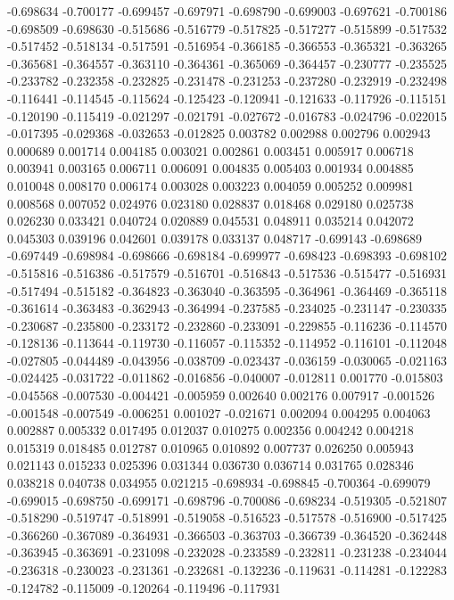 -0.698634
-0.700177
-0.699457
-0.697971
-0.698790
-0.699003
-0.697621
-0.700186
-0.698509
-0.698630
-0.515686
-0.516779
-0.517825
-0.517277
-0.515899
-0.517532
-0.517452
-0.518134
-0.517591
-0.516954
-0.366185
-0.366553
-0.365321
-0.363265
-0.365681
-0.364557
-0.363110
-0.364361
-0.365069
-0.364457
-0.230777
-0.235525
-0.233782
-0.232358
-0.232825
-0.231478
-0.231253
-0.237280
-0.232919
-0.232498
-0.116441
-0.114545
-0.115624
-0.125423
-0.120941
-0.121633
-0.117926
-0.115151
-0.120190
-0.115419
-0.021297
-0.021791
-0.027672
-0.016783
-0.024796
-0.022015
-0.017395
-0.029368
-0.032653
-0.012825
0.003782
0.002988
0.002796
0.002943
0.000689
0.001714
0.004185
0.003021
0.002861
0.003451
0.005917
0.006718
0.003941
0.003165
0.006711
0.006091
0.004835
0.005403
0.001934
0.004885
0.010048
0.008170
0.006174
0.003028
0.003223
0.004059
0.005252
0.009981
0.008568
0.007052
0.024976
0.023180
0.028837
0.018468
0.029180
0.025738
0.026230
0.033421
0.040724
0.020889
0.045531
0.048911
0.035214
0.042072
0.045303
0.039196
0.042601
0.039178
0.033137
0.048717
-0.699143
-0.698689
-0.697449
-0.698984
-0.698666
-0.698184
-0.699977
-0.698423
-0.698393
-0.698102
-0.515816
-0.516386
-0.517579
-0.516701
-0.516843
-0.517536
-0.515477
-0.516931
-0.517494
-0.515182
-0.364823
-0.363040
-0.363595
-0.364961
-0.364469
-0.365118
-0.361614
-0.363483
-0.362943
-0.364994
-0.237585
-0.234025
-0.231147
-0.230335
-0.230687
-0.235800
-0.233172
-0.232860
-0.233091
-0.229855
-0.116236
-0.114570
-0.128136
-0.113644
-0.119730
-0.116057
-0.115352
-0.114952
-0.116101
-0.112048
-0.027805
-0.044489
-0.043956
-0.038709
-0.023437
-0.036159
-0.030065
-0.021163
-0.024425
-0.031722
-0.011862
-0.016856
-0.040007
-0.012811
0.001770
-0.015803
-0.045568
-0.007530
-0.004421
-0.005959
0.002640
0.002176
0.007917
-0.001526
-0.001548
-0.007549
-0.006251
0.001027
-0.021671
0.002094
0.004295
0.004063
0.002887
0.005332
0.017495
0.012037
0.010275
0.002356
0.004242
0.004218
0.015319
0.018485
0.012787
0.010965
0.010892
0.007737
0.026250
0.005943
0.021143
0.015233
0.025396
0.031344
0.036730
0.036714
0.031765
0.028346
0.038218
0.040738
0.034955
0.021215
-0.698934
-0.698845
-0.700364
-0.699079
-0.699015
-0.698750
-0.699171
-0.698796
-0.700086
-0.698234
-0.519305
-0.521807
-0.518290
-0.519747
-0.518991
-0.519058
-0.516523
-0.517578
-0.516900
-0.517425
-0.366260
-0.367089
-0.364931
-0.366503
-0.363703
-0.366739
-0.364520
-0.362448
-0.363945
-0.363691
-0.231098
-0.232028
-0.233589
-0.232811
-0.231238
-0.234044
-0.236318
-0.230023
-0.231361
-0.232681
-0.132236
-0.119631
-0.114281
-0.122283
-0.124782
-0.115009
-0.120264
-0.119496
-0.117931
